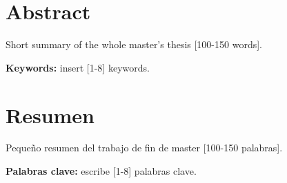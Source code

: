 \chapter*{Abstract}

Short summary of the whole master's thesis [100-150 words].

\vspace{11cm}
\textbf{Keywords:} insert [1-8] keywords.
\chapter*{Resumen}
Pequeño resumen del trabajo de fin de master [100-150 palabras].

\vspace{9cm}

\textbf{Palabras clave:} escribe [1-8] palabras clave.
